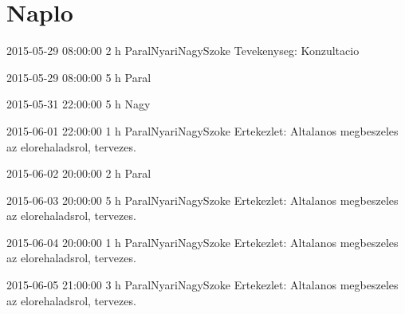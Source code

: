 \section{Naplo}
\begin{naplo}

            \bejegyzes
            {2015-05-29 08:00:00}
            {2 h}
            {Paral\newline Nyari\newline Nagy\newline Szoke}
            {Tevekenyseg: Konzultacio}
           

            \bejegyzes
            {2015-05-29 08:00:00}
            {5 h}
            {Paral}
            {}
           

            \bejegyzes
            {2015-05-31 22:00:00}
            {5 h}
            {Nagy}
            {}
           

            \bejegyzes
            {2015-06-01 22:00:00}
            {1 h}
            {Paral\newline Nyari\newline Nagy\newline Szoke}
            {Ertekezlet: Altalanos megbeszeles az elorehaladsrol, tervezes.}
           

            \bejegyzes
            {2015-06-02 20:00:00}
            {2 h}
            {Paral}
            {}
           

            \bejegyzes
            {2015-06-03 20:00:00}
            {5 h}
            {Paral\newline Nyari\newline Nagy\newline Szoke}
            {Ertekezlet: Altalanos megbeszeles az elorehaladsrol, tervezes.}
           

            \bejegyzes
            {2015-06-04 20:00:00}
            {1 h}
            {Paral\newline Nyari\newline Nagy\newline Szoke}
            {Ertekezlet: Altalanos megbeszeles az elorehaladsrol, tervezes.}
           

            \bejegyzes
            {2015-06-05 21:00:00}
            {3 h}
            {Paral\newline Nyari\newline Nagy\newline Szoke}
            {Ertekezlet: Altalanos megbeszeles az elorehaladsrol, tervezes.}
           


\end{naplo}
